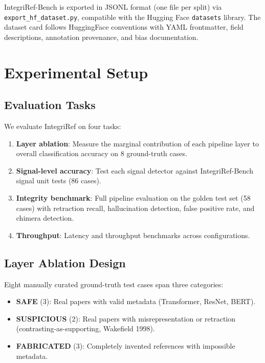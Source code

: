 \documentclass[sigconf,nonacm]{acmart}
\begin{document}
IntegriRef-Bench is exported in JSONL format (one file per split) via \texttt{export\_hf\_dataset.py}, compatible with the Hugging Face \texttt{datasets} library.
The dataset card follows HuggingFace conventions with YAML frontmatter, field descriptions, annotation provenance, and bias documentation.

\section{Experimental Setup}
\label{sec:experiments}

\subsection{Evaluation Tasks}

We evaluate IntegriRef on four tasks:

\begin{enumerate}
    \item \textbf{Layer ablation}: Measure the marginal contribution of each pipeline layer to overall classification accuracy on 8 ground-truth cases.
    \item \textbf{Signal-level accuracy}: Test each signal detector against IntegriRef-Bench signal unit tests (86 cases).
    \item \textbf{Integrity benchmark}: Full pipeline evaluation on the golden test set (58 cases) with retraction recall, hallucination detection, false positive rate, and chimera detection.
    \item \textbf{Throughput}: Latency and throughput benchmarks across configurations.
\end{enumerate}

\subsection{Layer Ablation Design}

Eight manually curated ground-truth test cases span three categories:

\begin{itemize}[leftmargin=*]
    \item \textbf{SAFE} (3): Real papers with valid metadata (Transformer, ResNet, BERT).
    \item \textbf{SUSPICIOUS} (2): Real papers with misrepresentation or retraction (contrasting-as-supporting, Wakefield 1998).
    \item \textbf{FABRICATED} (3): Completely invented references with impossible metadata.
\end{itemize}
\end{document}
